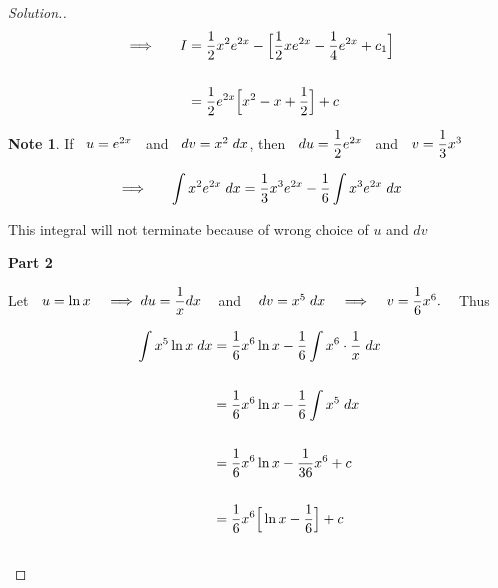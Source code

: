 \documentclass[11pt,a4paper]{article}
\theoremstyle{definition}
\newtheorem*{note}{Note}
\newenvironment{solution}
  {\renewcommand{\qedsymbol}{}\begin{proof}[\textit{Solution}.]}
  {\end{proof}}
\newcommand{\subhead}[1]{%
  \par\medskip\noindent\textbf{#1}\par\nobreak\smallskip}
\begin{document}
\begin{solution}
\begin{align*}
\implies\hspace{0.5cm} I & = \dfrac{1}{2}x^2 e^{2x} - \Big[ \dfrac{1}{2}x e^{2x} - \dfrac{1}{4}e^{2x} + c_1\Big]\\\\
& = \dfrac{1}{2}e^{2x}\Big[x^2 - x + \dfrac{1}{2}\Big] + c\\
\end{align*}

\begin{note}
If $\hspace{0.2cm} u = e^{2x}\hspace{0.2cm}$ and $\hspace{0.2cm} dv = x^2\hspace{0.1cm}dx$, then $\hspace{0.2cm}du = \dfrac{1}{2}e^{2x}\hspace{0.2cm}$ and $\hspace{0.2cm} v = \dfrac{1}{3}x^3$
\end{note}

$$\implies\hspace{0.5cm} \int x^2 e^{2x} \hspace{0.1cm}dx = \dfrac{1}{3}x^3e^{2x} - \frac{1}{6}\int x^3e^{2x}\hspace{0.1cm}dx$$

This integral will not terminate because of wrong choice of $u$ and $dv$

\subhead{Part 2}
Let $\hspace{0.2cm} u = \ln x\hspace{0.3cm}\implies du = \dfrac{1}{x}dx\hspace{0.3cm}$ and $\hspace{0.3cm} dv = x^5\hspace{0.1cm}dx\hspace{0.3cm}\implies\hspace{0.3cm} v = \dfrac{1}{6}x^6.\hspace{0.3cm}$ Thus

\begin{align*}
\int x^5 \ln x\hspace{0.1cm} dx & = \dfrac{1}{6}x^6\ln x - \frac{1}{6}\int x^6\cdot \frac{1}{x}\hspace{0.1cm}dx\\\\
& = \frac{1}{6}x^6\ln x - \frac{1}{6}\int x^5\hspace{0.1cm}dx\\\\
& = \dfrac{1}{6}x^6\ln x - \frac{1}{36}x^6 + c\\\\
& = \frac{1}{6}x^6\Big[ \ln x - \dfrac{1}{6}\Big] + c\\\\
\end{align*}
\end{solution}
\end{document}
